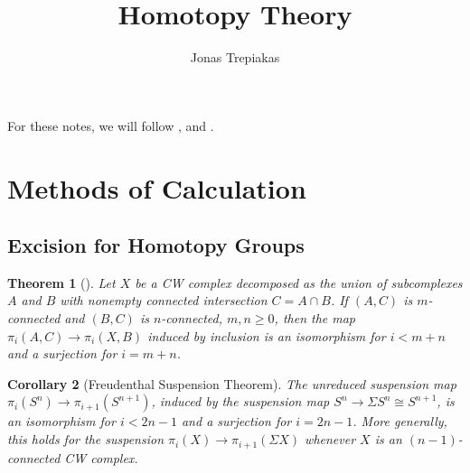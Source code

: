 \documentclass[reqno]{amsart}
\title{Homotopy Theory}
\author{Jonas Trepiakas}
\date{}
\newtheorem{theorem}{Theorem}[section]
\newtheorem{corollary}[theorem]{Corollary}
\theoremstyle{definition}
\theoremstyle{remark}
\begin{document}
    
\maketitle

For these notes, we will follow \cite{Hatcher}, \cite{Bredon}
and \cite{ORW}.

%




%



\section{Methods of Calculation}


\subsection{Excision for Homotopy Groups}

\begin{theorem}[]\label{Thm:Homotopy-Excision}
    Let $X$ be a CW complex decomposed as the union of
    subcomplexes $A$ and $B$ with nonempty connected
    intersection $C = A \cap B$. If
    $(A,C)$ is $m$-connected and
    $\left( B,C \right) $ is $n$-connected,
    $m,n \ge 0$, then the map
    $\pi_i (A,C) \to \pi_i (X,B)$ induced
    by inclusion is an isomorphism for
    $i < m+n$ and a surjection for
    $i = m+n$.
\end{theorem}

\begin{corollary}[Freudenthal Suspension Theorem]
    The unreduced suspension map
    $\pi_i (S^{n}) \to 
    \pi_{i+1} \left( S^{n+1} \right) $, induced
    by the suspension map $S^{n} \to 
    \Sigma S^{n} \cong S^{n+1}$, is an
    isomorphism for
    $i < 2n-1$ and a surjection for
    $i = 2n-1$. More generally, this holds for
    the suspension
    $\pi_i (X) \to \pi_{i+1}\left( \Sigma X \right) $ whenever
    $X$ is an $(n-1)$-connected CW complex.
\end{corollary}
\end{document}
